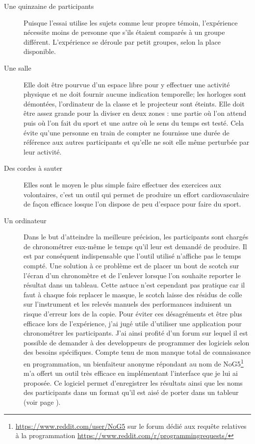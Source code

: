 \documentclass[12pt,fleqn,oneside,french,openany]{book} %
\begin{document}
\begin{description}
	\item[Une quinzaine de participants] Puisque l'essai utilise les sujets comme leur propre témoin, l'expérience nécessite moins de personne que s'ils étaient comparés à un groupe différent. L'expérience se déroule par petit groupes, selon la place disponible.
	\item[Une salle] Elle doit être pourvue d'un espace libre pour y effectuer une activité physique et ne doit fournir aucune indication temporelle; les horloges sont démontées, l'ordinateur de la classe et le projecteur sont éteints. Elle doit être assez grande pour la diviser en deux zones : une partie où l'on attend puis où l'on fait du sport et une autre où le sens du temps est testé. Cela évite qu'une personne en train de compter ne fournisse une durée de référence aux autres participants et qu'elle ne soit elle même perturbée par leur activité. 
	\item[Des cordes à sauter] Elles sont le moyen le plus simple faire effectuer des exercices aux volontaires, c'est un outil qui permet de produire un effort cardiovasculaire de façon efficace losque l'on dispose de peu d'espace pour faire du sport.
	\item[Un ordinateur] Dans le but d'atteindre la meilleure précision, les participants sont chargés de chronométrer eux-même le temps qu'il leur est demandé de produire. Il est par conséquent indispensable que l'outil utilisé n'affiche pas le temps compté. Une solution à ce problème est de placer un bout de scotch sur l'écran d'un chronomètre et de l'enlever lorsque l'on souhaite reporter le résultat dans un tableau. Cette astuce n'est cependant pas pratique car il faut à chaque fois replacer le masque, le scotch laisse des résidus de colle sur l'instrument et les relevés manuels des performances induisent un risque d'erreur lors de la copie. Pour éviter ces désagréments et être plus efficace lors de l'expérience, j'ai jugé utile d'utiliser une application pour chronométrer les participants. J'ai ainsi profité d'un forum sur lequel il est possible de demander à des developpeurs de programmer des logiciels selon des besoins spécifiques. Compte tenu de mon manque total de connaissance en programmation, un bienfaiteur anonyme répondant au nom de NoG5\footnote{\url{https://www.reddit.com/user/NoG5} sur le forum dédié aux requête relatives à la programmation \url{https://www.reddit.com/r/programmingrequests/}} m'a offert un outil très efficace en implémentant l'interface que je lui ai proposée. Ce logiciel permet d'enregistrer les résultats ainsi que les noms des participants dans un format qu'il est aisé de porter dans un tableur (voir page \pageref{sec:chrono}).
\end{description}
\end{document}
